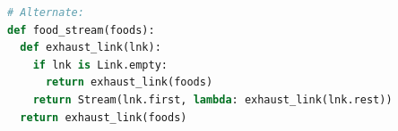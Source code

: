 \documentclass{exam}
\begin{document}
\begin{questions}
\begin{blocksection}
\begin{parts}
\begin{solution}[40mm]
\begin{lstlisting}[language=Python]
\end{lstlisting}
\end{solution}
\end{parts}
\end{blocksection}

\begin{solution}
\begin{lstlisting}[language=Python]
# Alternate: 
def food_stream(foods):
  def exhaust_link(lnk):
    if lnk is Link.empty:
      return exhaust_link(foods)
    return Stream(lnk.first, lambda: exhaust_link(lnk.rest))
  return exhaust_link(foods)
\end{lstlisting}
\end{solution}

\end{questions}

\end{document}

